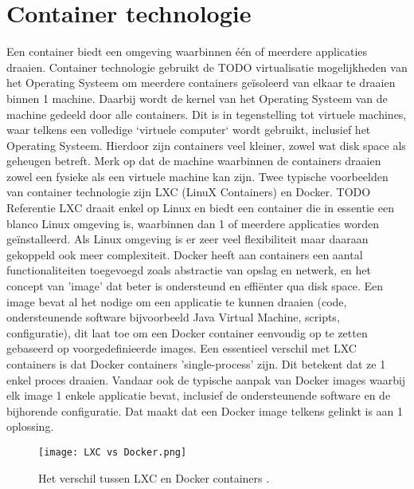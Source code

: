 \section{Container technologie}
Een container biedt een omgeving waarbinnen één of meerdere applicaties draaien. Container technologie gebruikt de TODO virtualisatie mogelijkheden van het Operating Systeem om meerdere containers geïsoleerd van elkaar te draaien binnen 1 machine. Daarbij wordt de kernel van het Operating Systeem van de machine gedeeld door alle containers.
\newline
Dit is in tegenstelling tot virtuele machines, waar telkens een volledige `virtuele computer` wordt gebruikt, inclusief het Operating Systeem. Hierdoor zijn containers veel kleiner, zowel wat disk space als geheugen betreft.
\newline
Merk op dat de machine waarbinnen de containers draaien zowel een fysieke als een virtuele machine kan zijn.
\newline
Twee typische voorbeelden van container technologie zijn LXC (LinuX Containers) en Docker. TODO Referentie
\newline
LXC draait enkel op Linux en biedt een container die in essentie een blanco Linux omgeving is, waarbinnen dan 1 of meerdere applicaties worden geïnstalleerd. Als Linux omgeving is er zeer veel flexibiliteit maar daaraan gekoppeld ook meer complexiteit.
\newline
Docker heeft aan containers een aantal functionaliteiten toegevoegd zoals abstractie van opslag en netwerk, en het concept van 'image' dat beter is ondersteund en effiënter qua disk space. Een image bevat al het nodige om een applicatie te kunnen draaien (code, ondersteunende software bijvoorbeeld Java Virtual Machine, scripts, configuratie), dit laat toe om een Docker container eenvoudig op te zetten gebaseerd op voorgedefinieerde images.
\newline
Een essentieel verschil met LXC containers is dat Docker containers 'single-process' zijn. Dit betekent dat ze 1 enkel proces draaien. Vandaar ook de typische aanpak van Docker images waarbij elk image 1 enkele applicatie bevat, inclusief de ondersteunende software en de bijhorende configuratie. Dat maakt dat een Docker image telkens gelinkt is aan 1 oplossing.
\newline
\begin{figure}[H]
    \texttt{[image: LXC vs Docker.png]}
    \caption{Het verschil tussen LXC en Docker containers \autocite{Kahuha2023}.}
\end{figure}

